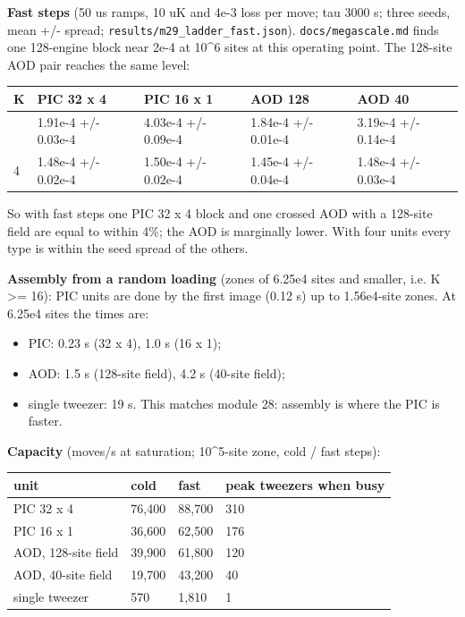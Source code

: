 \textbf{Fast steps} (50 us ramps, 10 uK and 4e-3 loss per move; tau 3000
s; three seeds, mean +/- spread;
\texttt{results/m29\_ladder\_fast.json}). \texttt{docs/megascale.md}
finds one 128-engine block near 2e-4 at 10\^{}6 sites at this operating
point. The 128-site AOD pair reaches the same level:

{\small
\begin{longtable}[]{@{}lllll@{}}
\toprule\noalign{}
K & PIC 32 x 4 & PIC 16 x 1 & AOD 128 & AOD 40 \\
\midrule\noalign{}
\endhead
\bottomrule\noalign{}
\endlastfoot
1 & 1.91e-4 +/- 0.03e-4 & 4.03e-4 +/- 0.09e-4 & 1.84e-4 +/- 0.01e-4 &
3.19e-4 +/- 0.14e-4 \\
4 & 1.48e-4 +/- 0.02e-4 & 1.50e-4 +/- 0.02e-4 & 1.45e-4 +/- 0.04e-4 &
1.48e-4 +/- 0.03e-4 \\
\end{longtable}
}

So with fast steps one PIC 32 x 4 block and one crossed AOD with a
128-site field are equal to within 4\%; the AOD is marginally lower.
With four units every type is within the seed spread of the others.

\textbf{Assembly from a random loading} (zones of 6.25e4 sites and
smaller, i.e. K \textgreater= 16): PIC units are done by the first image
(0.12 s) up to 1.56e4-site zones. At 6.25e4 sites the times are:

\begin{itemize}
\tightlist
\item
  PIC: 0.23 s (32 x 4), 1.0 s (16 x 1);
\item
  AOD: 1.5 s (128-site field), 4.2 s (40-site field);
\item
  single tweezer: 19 s. This matches module 28: assembly is where the
  PIC is faster.
\end{itemize}

\textbf{Capacity} (moves/s at saturation; 10\^{}5-site zone, cold / fast
steps):

{\small
\begin{longtable}[]{@{}llll@{}}
\toprule\noalign{}
unit & cold & fast & peak tweezers when busy \\
\midrule\noalign{}
\endhead
\bottomrule\noalign{}
\endlastfoot
PIC 32 x 4 & 76,400 & 88,700 & 310 \\
PIC 16 x 1 & 36,600 & 62,500 & 176 \\
AOD, 128-site field & 39,900 & 61,800 & 120 \\
AOD, 40-site field & 19,700 & 43,200 & 40 \\
single tweezer & 570 & 1,810 & 1 \\
\end{longtable}
}

